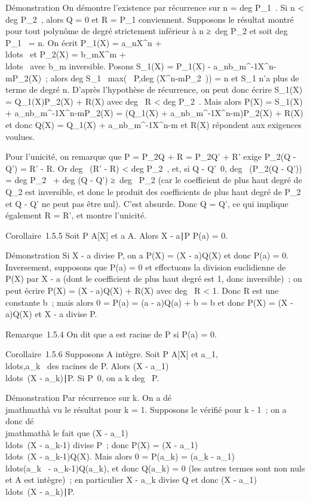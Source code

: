 Démonstration On démontre l'existence par récurrence sur n
= deg P_1~. Si n
\textless{} deg P_2~, alors Q = 0 et R
= P_1 conviennent. Supposons le résultat montré pour tout
polynôme de degré strictement inférieur à n ≥\
deg P_2 et soit deg P_1~ =
n. On écrit P_1(X) = a_nX^n +
\\ldots~ et
P_2(X) = b_mX^m +
\\ldots~ avec
b_m inversible. Posons S_1(X) = P_1(X) -
a_nb_m^-1X^n-mP_2(X)~;
alors deg S_1~
\leq max(\deg~
P,deg (X^n-mP_2~)) = n et
S_1 n'a plus de terme de degré n. D'après l'hypothèse de
récurrence, on peut donc écrire S_1(X) =
Q_1(X)P_2(X) + R(X) avec deg~
R \textless{} deg P_2~. Mais alors
P(X) = S_1(X) +
a_nb_m^-1X^n-mP_2(X) =
(Q_1(X) +
a_nb_m^-1X^n-m)P_2(X) +
R(X) et donc Q(X) = Q_1(X) +
a_nb_m^-1X^n-m et R(X) répondent aux
exigences voulues.

Pour l'unicité, on remarque que P = P_2Q + R = P_2Q' +
R' exige P_2(Q - Q') = R' - R. Or deg~
(R' - R) \textless{} deg P_2~, et, si
Q - Q'\neq~0, deg~
(P_2(Q - Q')) = deg P_2~
+ deg (Q - Q') ≥\ deg~
P_2 (car le coefficient de plus haut degré de Q_2 est
inversible, et donc le produit des coefficients de plus haut degré de
P_2 et Q - Q' ne peut pas être nul). C'est absurde. Donc Q =
Q', ce qui implique également R = R', et montre l'unicité.

Corollaire~1.5.5 Soit P \in A{[}X{]} et a \in A. Alors X -
a∣P \mathrel\Leftrightarrow P(a) = 0.

Démonstration Si X - a divise P, on a P(X) = (X - a)Q(X) et donc P(a) =
0. Inversement, supposons que P(a) = 0 et effectuons la division
euclidienne de P(X) par X - a (dont le coefficient de plus haut degré
est 1, donc inversible)~; on peut écrire P(X) = (X - a)Q(X) + R(X) avec
deg~ R \textless{} 1. Donc R est une constante
b~; mais alors 0 = P(a) = (a - a)Q(a) + b = b et donc P(X) = (X - a)Q(X)
et X - a divise P.

Remarque~1.5.4 On dit que a est racine de P si P(a) = 0.

Corollaire~1.5.6 Supposons A intègre. Soit P \in A{[}X{]} et
a_1,\\ldots,a_k~
des racines de P. Alors (X -
a_1)\\ldots~(X
- a_k)∣P. Si
P\neq~0, on a k \leq deg~
P.

Démonstration Par récurrence sur k. On a dé\\jmathmathà vu le résultat pour k = 1.
Supposons le vérifié pour k - 1~; on a donc dé\\jmathmathà le fait que (X -
a_1)\\ldots~(X
- a_k-1) divise P~; donc P(X) = (X -
a_1)\\ldots~(X
- a_k-1)Q(X). Mais alors 0 = P(a_k) = (a_k -
a_1)\\ldots(a_k~
- a_k-1)Q(a_k), et donc Q(a_k) = 0 (les
autres termes sont non nuls et A est intègre)~; en particulier X -
a_k divise Q et donc (X -
a_1)\\ldots~(X
- a_k)∣P.

